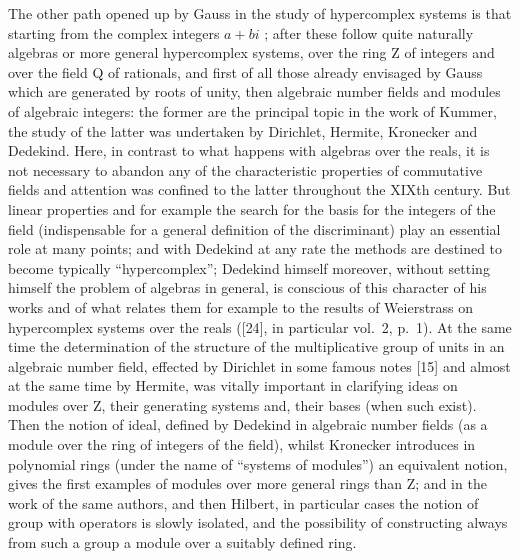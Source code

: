 The other path opened up by Gauss in the study of hypercomplex systems is that starting from the complex integers \(a + bi\) ; after these follow quite naturally algebras or more general hypercomplex systems, over the ring Z of integers and over the field Q of rationals, and first of all those already envisaged by Gauss which are generated by roots of unity, then algebraic number fields and modules of algebraic integers: the former are the principal topic in the work of Kummer, the study of the latter was undertaken by Dirichlet, Hermite, Kronecker and Dedekind. Here, in contrast to what happens with algebras over the reals, it is not necessary to abandon any of the characteristic properties of commutative fields and attention was confined to the latter throughout the XIXth century. But linear properties and for example the search for the basis for the integers of the field (indispensable for a general definition of the discriminant) play an essential role at many points; and with Dedekind at any rate the methods are destined to become typically ``hypercomplex''; Dedekind himself moreover, without setting himself the problem of algebras in general, is conscious of this character of his works and of what relates them for example to the results of Weierstrass on hypercomplex systems over the reals ({[}24{]}, in particular vol.~2, p.~1). At the same time the determination of the structure of the multiplicative group of units in an algebraic number field, effected by Dirichlet in some famous notes {[}15{]} and almost at the same time by Hermite, was vitally important in clarifying ideas on modules over Z, their generating systems and, their bases (when such exist). Then the notion of ideal, defined by Dedekind in algebraic number fields (as a module over the ring of integers of the field), whilst Kronecker introduces in polynomial rings (under the name of ``systems of modules'') an equivalent notion, gives the first examples of modules over more general rings than Z; and in the work of the same authors, and then Hilbert, in particular cases the notion of group with operators is slowly isolated, and the possibility of constructing always from such a group a module over a suitably defined ring.

